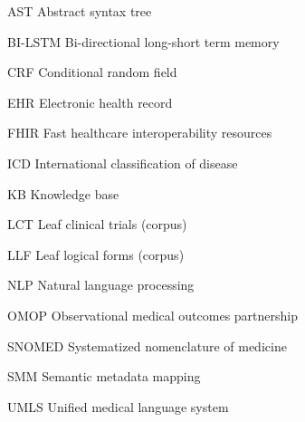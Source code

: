 \documentclass[../main.tex]{subfiles}
\begin{document}
\begin{glossary}
\item[AST] Abstract syntax tree
\item[BI-LSTM] Bi-directional long-short term memory
\item[CRF] Conditional random field
\item[EHR] Electronic health record
\item[FHIR] Fast healthcare interoperability resources
\item[ICD] International classification of disease
\item[KB] Knowledge base
\item[LCT] Leaf clinical trials (corpus)
\item[LLF] Leaf logical forms (corpus)
\item[NLP] Natural language processing
\item[OMOP] Observational medical outcomes partnership
\item[SNOMED] Systematized nomenclature of medicine
\item[SMM] Semantic metadata mapping
\item[UMLS] Unified medical language system
 
\end{glossary}
\end{document}
